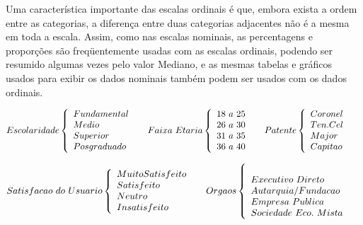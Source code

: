\begin{enumerate}
\vskip0.3cm
Uma característica importante das escalas ordinais é que, embora exista a ordem entre as categorias, a diferença entre duas categorias adjacentes não é a mesma em toda a escala. Assim, como nas escalas nominais, as percentagens e proporções são freqüentemente usadas com as escalas ordinais, podendo ser resumido algumas vezes pelo valor Mediano, e as mesmas tabelas e gráficos usados para exibir os dados nominais também podem ser usados com os dados ordinais.

\newpage

$$
    Escolaridade
    \left\{
    \begin{array}{ll}
    Fundamental  & \hbox{ } \\
    Medio        & \hbox{ } \\
    Superior     & \hbox{ } \\
    Posgraduado  & \hbox{ }
    \end{array}
    \right.
    Faixa \ Etaria
    \left\{
    \begin{array}{ll}
    18 \ a \ 25   & \hbox{ } \\
    26 \ a \ 30   & \hbox{ } \\
    31 \ a \ 35   & \hbox{ } \\
    36 \ a \ 40   & \hbox{ }
    \end{array}
    \right.
    Patente
 \left\{
    \begin{array}{ll}
    Coronel        & \hbox{ } \\
    Ten. Cel       & \hbox{ } \\
    Major          & \hbox{ } \\
    Capitao        & \hbox{ }
    \end{array}
    \right.
$$

$$
    Satisfacao \ do \ Usuario
    \left\{
    \begin{array}{ll}
    Muito Satisfeito  & \hbox{ } \\
    Satisfeito        & \hbox{ } \\
    Neutro            & \hbox{ } \\
    Insatisfeito      & \hbox{ }
    \end{array}
    \right.
    Orgaos
    \left\{
    \begin{array}{ll}
       & \hbox{ } \\
    Executivo \ Direto    & \hbox{ } \\
    Autarquia/Fundacao    & \hbox{ } \\
    Empresa \ Publica     & \hbox{ } \\
    Sociedade \ Eco. \ Mista  & \hbox{ }    
    \end{array}
     \right.
$$


\end{enumerate}
